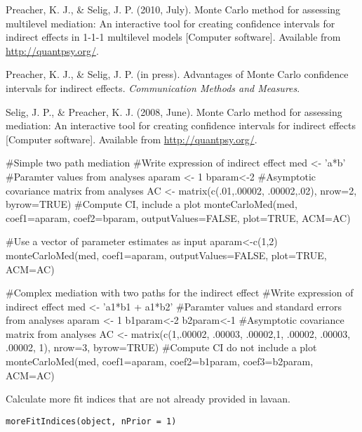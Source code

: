 \documentclass[a4paper]{book}
\begin{document}
%
\begin{References}\relax
Preacher, K. J., \& Selig, J. P. (2010, July). Monte Carlo method for assessing multilevel mediation: An interactive tool for creating confidence intervals for indirect effects in 1-1-1 multilevel models [Computer software]. Available from \url{http://quantpsy.org/}.

Preacher, K. J., \& Selig, J. P. (in press). Advantages of Monte Carlo confidence intervals for indirect effects. \emph{Communication Methods and Measures}.

Selig, J. P., \& Preacher, K. J. (2008, June). Monte Carlo method for assessing mediation: An interactive tool for creating confidence intervals for indirect effects [Computer software]. Available from \url{http://quantpsy.org/}.

\end{References}
%
\begin{Examples}
\begin{ExampleCode}
#Simple two path mediation
#Write expression of indirect effect
med <- 'a*b'
#Paramter values from analyses
aparam <- 1
bparam<-2
#Asymptotic covariance matrix from analyses
AC <- matrix(c(.01,.00002,
               .00002,.02), nrow=2, byrow=TRUE)
#Compute CI, include a plot
monteCarloMed(med, coef1=aparam, coef2=bparam, outputValues=FALSE, plot=TRUE, ACM=AC)

#Use a vector of parameter estimates as input
aparam<-c(1,2)
monteCarloMed(med, coef1=aparam, outputValues=FALSE, plot=TRUE, ACM=AC)



#Complex mediation with two paths for the indirect effect
#Write expression of indirect effect
med <- 'a1*b1 + a1*b2'
#Paramter values and standard errors from analyses
aparam <- 1
b1param<-2
b2param<-1
#Asymptotic covariance matrix from analyses
AC <- matrix(c(1,.00002, .00003,
                    .00002,1, .00002,
					.00003, .00002, 1), nrow=3, byrow=TRUE)
#Compute CI do not include a plot
monteCarloMed(med, coef1=aparam, coef2=b1param, coef3=b2param, ACM=AC)
\end{ExampleCode}
\end{Examples}
%
\begin{Description}\relax
Calculate more fit indices that are not already provided in lavaan.
\end{Description}
%
\begin{Usage}
\begin{verbatim}
moreFitIndices(object, nPrior = 1)
\end{verbatim}
\end{Usage}
\end{document}
